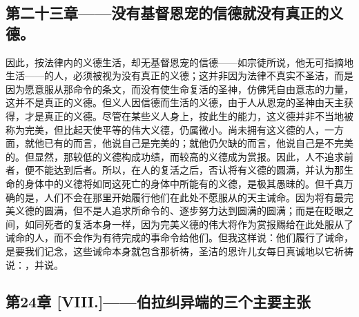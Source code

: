 
\subsection{第二十三章——没有基督恩宠的信德就没有真正的义德。}

因此，按法律内的义德生活，却无基督恩宠的信德——如宗徒所说，他无可指摘地生活——的人，必须被视为没有真正的义德；这并非因为法律不真实不圣洁，而是因为愿意服从那命令的条文，而没有使生命复活的圣神，仿佛凭自由意志的力量，这并不是真正的义德。但义人因信德而生活的义德，由于人从恩宠的圣神由天主获得，才是真正的义德。尽管在某些义人身上，按此生的能力，这义德并非不当地被称为完美，但比起天使平等的伟大义德，仍属微小。尚未拥有这义德的人，一方面，就他已有的而言，他说自己是完美的；就他仍欠缺的而言，他说自己是不完美的。但显然，那较低的义德构成功绩，而较高的义德成为赏报。因此，人不追求前者，便不能达到后者。所以，在人的复活之后，否认将有义德的圆满，并认为那生命的身体中的义德将如同这死亡的身体中所能有的义德，是极其愚昧的。但千真万确的是，人们不会在那里开始履行他们在此处不愿服从的天主诫命。因为将有最完美义德的圆满，但不是人追求所命令的、逐步努力达到圆满的圆满；而是在眨眼之间，如同死者的复活本身一样，因为完美义德的伟大将作为赏报赐给在此处服从了诫命的人，而不会作为有待完成的事命令给他们。但我这样说：他们履行了诫命，是要我们记念，这些诫命本身就包含那祈祷，圣洁的恩许儿女每日真诚地以它祈祷说：，并说。\par


\subsection{第24章 [VIII.]——伯拉纠异端的三个主要主张}

